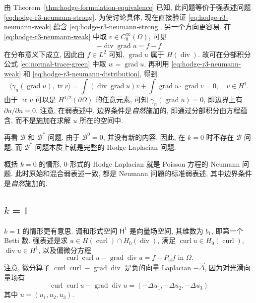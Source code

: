 由 Theorem~\ref{thm:hodge-formulation-equivalence} 已知, 此问题等价于强表述问题 \eqref{eq:hodge-r3-neumann-strong}. 为使讨论具体, 现在直接验证 \eqref{eq:hodge-r3-neumann-weak} 蕴含 \eqref{eq:hodge-r3-neumann-strong}, 另一个方向更容易. 在 \eqref{eq:hodge-r3-neumann-weak} 中取 $v\in C_0^\infty(\Omega)$, 可见
\begin{equation}\label{eq:hodge-r3-neumann-distribution}
-\operatorname{div}\operatorname{grad}u=f-\bar f
\end{equation}
在分布意义下成立, 因此由 $f\in L^2$ 可知, $\operatorname{grad}u$ 属于 $H(\operatorname{div})$. 故可在分部积分公式 \eqref{eq:normal-trace-green} 中取 $w=\operatorname{grad}u$, 再利用 \eqref{eq:hodge-r3-neumann-weak} 和 \eqref{eq:hodge-r3-neumann-distribution}, 得到
\[
\langle\gamma_n(\operatorname{grad}u),\operatorname{tr}v\rangle=\int(\operatorname{div}\operatorname{grad}u)v+\int\operatorname{grad}u\cdot\operatorname{grad}v=0,\quad v\in H^1.
\]
由于 $\operatorname{tr}v$ 可以是 $H^{1/2}(\partial\Omega)$ 的任意元素, 可知 $\gamma_n(\operatorname{grad}u)=0$, 即边界上有 $\partial u/\partial n=0$. 注意, 在弱表述中, 边界条件是\emph{自然}施加的, 即通过分部积分由方程蕴含, 而不是施加在求解 $u$ 所在的空间中.

再看 $\mathcal B$ 和 $\mathcal B^*$ 问题, 由于 $\mathcal B^0=0$, 并没有新的内容. 因此, 在 $k=0$ 时不存在 $\mathcal B$ 问题, 而 $\mathcal B^*$ 问题本质上就是完整的 Hodge Laplacian 问题.

概括 $k=0$ 的情形, $0$-形式的 Hodge Laplacian 就是 Poisson 方程的 Neumann 问题. 此时原始和混合弱表述一致, 都是 Neumann 问题的标准弱表述, 其中边界条件是\emph{自然}施加的.

\subsection{$k=1$}\label{subsec:hodge-r3-k1}

$k=1$ 的情形更有意思. 调和形式空间 $\mathsf H^1$ 是向量场空间, 其维数为 $b_1$, 即第一个 Betti 数. 强表述是求 $u\in H(\operatorname{curl})\cap H_{0}(\operatorname{div})$, 满足 $\operatorname{curl}u\in H_{0}(\operatorname{curl})$, $\operatorname{div}u\in H^1$, 以及偏微分方程
\begin{equation}\label{eq:hodge-r3-vector-laplace}
\operatorname{curl}\operatorname{curl}u-\operatorname{grad}\operatorname{div}u=f-P_{\mathsf H}f\text{ in }\Omega.
\end{equation}
注意, 微分算子 $\operatorname{curl}\operatorname{curl}-\operatorname{grad}\operatorname{div}$ 是负的向量 Laplacian $-\vec\Delta$, 因为对光滑向量场有 \[\operatorname{curl}\operatorname{curl}u-\operatorname{grad}\operatorname{div}u=(-\Delta u_1,-\Delta u_2,-\Delta u_3)\] 其中 $u=(u_1,u_2,u_3)$.

